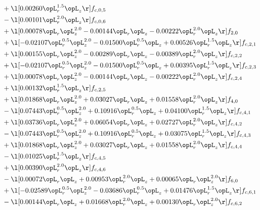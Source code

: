 \begin{alignat}{2}
& + \l[  0.00260 \opL_r^{1.5} \opL_z  \r] f_{c,0,5} \nonumber \\ 
& - \l[  0.00101 \opL_r^{2.0} \opL_z  \r] f_{c,0,6} \nonumber \\ 
& + \l[  0.00078 \opL_r \opL_z^{2.0}   -0.00144 \opL_r \opL_z   -0.00222 \opL_r^{2.0} \opL_z  \r] f_{2,0} \nonumber \\ 
& + \l[  -0.02107 \opL_r^{0.5} \opL_z^{2.0}   -0.01500 \opL_r^{0.5} \opL_z +  0.00526 \opL_r^{1.5} \opL_z  \r] f_{c,2,1} \nonumber \\ 
& + \l[  0.00155 \opL_r \opL_z^{2.0}   -0.00289 \opL_r \opL_z   -0.00389 \opL_r^{2.0} \opL_z  \r] f_{c,2,2} \nonumber \\ 
& + \l[  -0.02107 \opL_r^{0.5} \opL_z^{2.0}   -0.01500 \opL_r^{0.5} \opL_z +  0.00395 \opL_r^{1.5} \opL_z  \r] f_{c,2,3} \nonumber \\ 
& + \l[  0.00078 \opL_r \opL_z^{2.0}   -0.00144 \opL_r \opL_z   -0.00222 \opL_r^{2.0} \opL_z  \r] f_{c,2,4} \nonumber \\ 
& + \l[  0.00132 \opL_r^{1.5} \opL_z  \r] f_{c,2,5} \nonumber \\ 
& + \l[  0.01868 \opL_r \opL_z^{2.0} +  0.03027 \opL_r \opL_z +  0.01558 \opL_r^{2.0} \opL_z  \r] f_{4,0} \nonumber \\ 
& - \l[  0.07443 \opL_r^{0.5} \opL_z^{2.0} +  0.10916 \opL_r^{0.5} \opL_z +  0.04100 \opL_r^{1.5} \opL_z  \r] f_{c,4,1} \nonumber \\ 
& + \l[  0.03736 \opL_r \opL_z^{2.0} +  0.06054 \opL_r \opL_z +  0.02727 \opL_r^{2.0} \opL_z  \r] f_{c,4,2} \nonumber \\ 
& - \l[  0.07443 \opL_r^{0.5} \opL_z^{2.0} +  0.10916 \opL_r^{0.5} \opL_z +  0.03075 \opL_r^{1.5} \opL_z  \r] f_{c,4,3} \nonumber \\ 
& + \l[  0.01868 \opL_r \opL_z^{2.0} +  0.03027 \opL_r \opL_z +  0.01558 \opL_r^{2.0} \opL_z  \r] f_{c,4,4} \nonumber \\ 
& - \l[  0.01025 \opL_r^{1.5} \opL_z  \r] f_{c,4,5} \nonumber \\ 
& + \l[  0.00390 \opL_r^{2.0} \opL_z  \r] f_{c,4,6} \nonumber \\ 
& - \l[  0.00072 \opL_r \opL_z +  0.00953 \opL_r^{2.0} \opL_z +  0.00065 \opL_r \opL_z^{2.0}  \r] f_{6,0} \nonumber \\ 
& + \l[  -0.02589 \opL_r^{0.5} \opL_z^{2.0}   -0.03686 \opL_r^{0.5} \opL_z +  0.01476 \opL_r^{1.5} \opL_z  \r] f_{c,6,1} \nonumber \\ 
& - \l[  0.00144 \opL_r \opL_z +  0.01668 \opL_r^{2.0} \opL_z +  0.00130 \opL_r \opL_z^{2.0}  \r] f_{c,6,2} \nonumber \\ 

\end{alignat}
